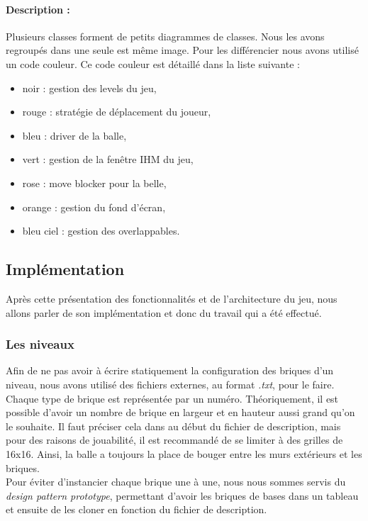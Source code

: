 \documentclass[a4paper,10pt]{article}
\begin{document}
 		\paragraph{Description :}
 		Plusieurs classes forment de petits diagrammes de classes. Nous les avons regroupés dans une seule est même image.
 		Pour les différencier
 		nous avons utilisé un code couleur. Ce code couleur est détaillé dans la liste suivante : \\
 		\begin{itemize}
 		\item noir : gestion des levels du jeu,
 		\item rouge : stratégie de déplacement du joueur,
 		\item bleu : driver de la balle,
 		\item vert : gestion de la fenêtre IHM du jeu,
 		\item rose : move blocker pour la belle,
 		\item orange : gestion du fond d'écran,
 		\item bleu ciel : gestion des overlappables.
 		\end{itemize}


\subsection{Implémentation}
    Après cette présentation des fonctionnalités et de l'architecture du jeu, nous allons
    parler de son implémentation et donc du travail qui a été effectué.

    \subsubsection{Les niveaux}
        Afin de ne pas avoir à écrire statiquement la configuration des briques d'un niveau, nous avons
        utilisé des fichiers externes, au format \textit{.txt}, pour le faire. Chaque type de brique est représentée par un numéro.
        Théoriquement, il est possible d'avoir un nombre de brique en largeur et en hauteur aussi grand qu'on le souhaite.
        Il faut préciser cela dans au début du fichier de description, mais pour des raisons de jouabilité, il
        est recommandé de se limiter à des grilles de 16x16. Ainsi, la balle a toujours la place de bouger entre les murs
        extérieurs et les briques. \\

        Pour éviter d'instancier chaque brique une à une, nous nous sommes servis du \textit{design pattern prototype},
        permettant d'avoir les briques de bases dans un tableau et ensuite de les cloner en fonction du
        fichier de description.
\end{document}
